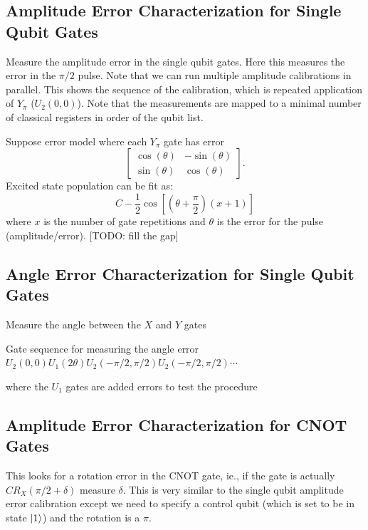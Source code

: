 \documentclass[11pt, oneside]{article}   	%
\begin{document}
\subsection{Amplitude Error Characterization for Single Qubit Gates}
Measure the amplitude error in the single qubit gates. 
Here this measures the error in the $\pi/2$ pulse. 
Note that we can run multiple amplitude calibrations in parallel. 
This shows the sequence of the calibration, which is repeated application of $Y_{\pi}$ ($U_2(0, 0)$). 
Note that the measurements are mapped to a minimal number of classical registers in order of the qubit list.

Suppose error model where each $Y_{\pi}$ gate has error
\begin{equation}
\begin{bmatrix}
\cos (\theta) & - \sin (\theta) \\
\sin (\theta) & \cos (\theta)
\end{bmatrix}.
\end{equation}
Excited state population can be fit as:
\begin{equation}
C - \frac{1}{2} \cos \left[ \left( \theta + \frac{\pi}{2} \right) (x + 1) \right]
\end{equation}
where $x$ is the number of gate repetitions and $\theta$ is the error for the pulse (amplitude/error). [TODO: fill the gap]

\subsection{Angle Error Characterization for Single Qubit Gates}
Measure the angle between the $X$ and $Y$ gates

Gate sequence for measuring the angle error
$U_2(0, 0) U_1 (2 \theta) U_2(- \pi/2, \pi/2) U_2(- \pi/2, \pi/2) \cdots$

where the $U_1$ gates are added errors to test the procedure

\subsection{Amplitude Error Characterization for CNOT Gates}
This looks for a rotation error in the CNOT gate, ie., if the gate is actually $CR_X(\pi/2+\delta)$ measure $\delta$. 
This is very similar to the single qubit amplitude error calibration except we need to specify a control qubit (which is set to be in state $\ket{1}$) and the rotation is a $\pi$.
\end{document}
